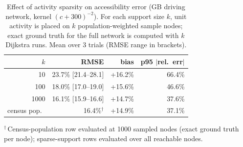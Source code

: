 \begin{table}[t]
\centering
\caption{Effect of activity sparsity on accessibility error (GB driving network, kernel $(c+300)^{-2}$). For each support size $k$, unit activity is placed on $k$ population-weighted sample nodes; exact ground truth for the full network is computed with $k$ Dijkstra runs. Mean over 3 trials (RMSE range in brackets).}
\label{tab:si-error-anatomy-sparse}
\begin{tabular}{rrrr}
\toprule
$k$ & RMSE & bias & p95 $|$rel.\ err$|$ \\
\midrule
10 & 23.7\% [21.4--28.1] & +16.2\% & 66.4\% \\
100 & 18.0\% [17.0--19.0] & +15.6\% & 46.6\% \\
1000 & 16.1\% [15.9--16.6] & +14.7\% & 37.6\% \\
\midrule
census pop.\ & 16.4\%$^{\dagger}$ & +14.9\% & 37.1\% \\
\bottomrule
\end{tabular}

\smallskip
\raggedright\footnotesize $^{\dagger}$\,Census-population row evaluated at 1000 sampled nodes (exact ground truth per node); sparse-support rows evaluated over all reachable nodes.
\end{table}
